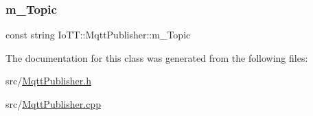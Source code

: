 \subsubsection{\texorpdfstring{m\+\_\+\+Topic}{m\_Topic}}
{\footnotesize\ttfamily const string Io\+T\+T\+::\+Mqtt\+Publisher\+::m\+\_\+\+Topic\hspace{0.3cm}{\ttfamily [protected]}}



The documentation for this class was generated from the following files\+:\begin{DoxyCompactItemize}
\item 
src/\hyperlink{MqttPublisher_8h}{Mqtt\+Publisher.\+h}\item 
src/\hyperlink{MqttPublisher_8cpp}{Mqtt\+Publisher.\+cpp}\end{DoxyCompactItemize}
